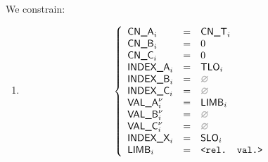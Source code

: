 \begin{center}
\end{center}

We constrain:
\begin{enumerate}
	\item 
		\[
			\left\{ \begin{array}{lclr}
				\cnA      _{i}       & = & \cnT_{i}           \\
				\cnB      _{i}       & = & 0                  \\
				\cnC      _{i}       & = & 0                  \\
				\indexA   _{i}       & = & \tlo_{i}           \\
				\indexB   _{i}       & = & \nothing           \\
				\indexC   _{i}       & = & \nothing           \\
				\valA     _{i}\new{} & = & \limb_{i}          \\
				\valB     _{i}\new{} & = & \nothing           \\
				\valC     _{i}\new{} & = & \nothing           \\
				\indexX   _{i}       & = & \slo_{i}           \\
				\limb     _{i}       & = & \relevantValue     \\
			\end{array} \right.
		\]
\end{enumerate}

